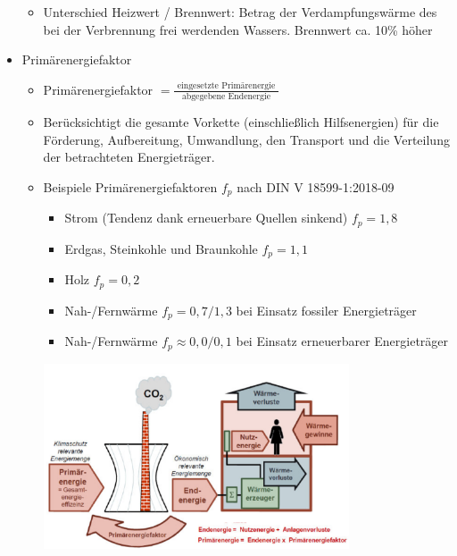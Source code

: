 \documentclass[fleqn,twoside,dvipsnames]{article}
\begin{document}
\begin{itemize}
\begin{itemize}
                            \item Unterschied Heizwert / Brennwert: Betrag der Verdampfungswärme des bei der Verbrennung frei werdenden Wassers. Brennwert ca. 10\% höher
                        \end{itemize}
                    \item Primärenergiefaktor
                        \begin{itemize}
                            \item Primärenergiefaktor $=\frac{\text { eingesetzte Primärenergie }}{\text { abgegebene Endenergie }}$
                            \item Berücksichtigt die gesamte Vorkette (einschließlich Hilfsenergien) für die Förderung, Aufbereitung, Umwandlung, den Transport und die Verteilung der betrachteten Energieträger.
                            \item Beispiele Primärenergiefaktoren $f_p$ nach DIN V 18599-1:2018-09
                            \begin{itemize}
                                \item Strom (Tendenz dank erneuerbare Quellen sinkend) $f_p=1,8$
                                \item Erdgas, Steinkohle und Braunkohle $f_p=1,1$
                                \item Holz $f_p=0,2$
                                \item Nah-/Fernwärme $f_p=0,7/1,3$ bei Einsatz fossiler Energieträger
                                \item Nah-/Fernwärme $f_p \approx 0,0/0,1$ bei Einsatz erneuerbarer Energieträger
                            \end{itemize}
                            \includegraphics[width=0.75\textwidth]{Grafiken/ES/Uebersicht Energie (End,Nutz,etc).png}
                        \end{itemize}

\end{itemize}
\end{document}
